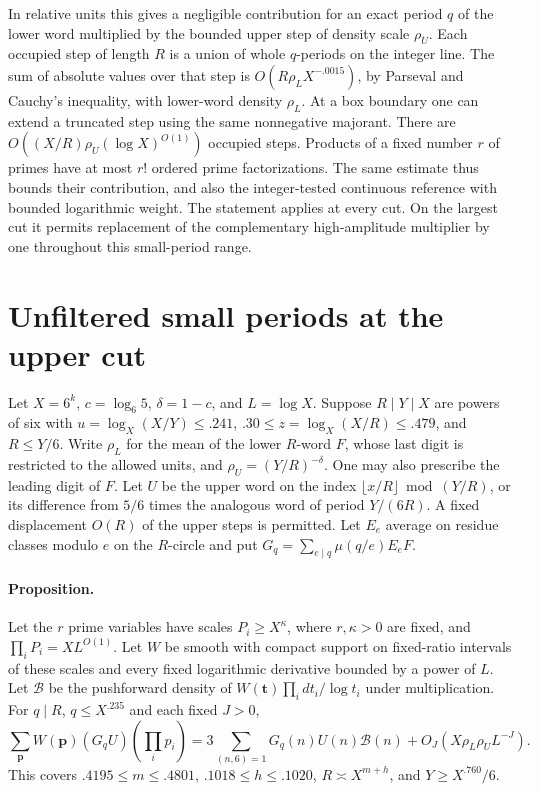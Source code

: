 \documentclass[11pt,a4paper]{article}
\theoremstyle{paperplain}
\numberwithin{equation}{section}
\begin{document}
In relative units this gives a negligible contribution for an exact
period $q$ of the lower word multiplied by the bounded upper step of
density scale $\rho_U$. Each occupied step of length $R$ is a union of
whole $q$-periods on the integer line. The sum of absolute values over
that step is $O(R\rho_L X^{-.0015})$, by Parseval and Cauchy's
inequality, with lower-word density $\rho_L$. At a box boundary one
can extend a truncated step using the same nonnegative majorant.
There are $O((X/R)\rho_U (\log X)^{O(1)})$ occupied steps. Products
of a fixed number $r$ of primes have at most $r!$ ordered prime
factorizations. The same estimate thus bounds their contribution, and
also the integer-tested continuous reference with bounded logarithmic
weight. The statement applies at every cut. On the largest cut it
permits replacement of the complementary high-amplitude multiplier by
one throughout this small-period range.

\section{Unfiltered small periods at the upper cut}
\label{six:unfiltered}

Let $X=6^k$, $c=\log_6 5$, $\delta=1-c$, and $L=\log X$.
Suppose $R\mid Y\mid X$ are powers of six with $u=\log_X(X/Y)\le .241$,
$.30\le z=\log_X(X/R)\le .479$, and $R\le Y/6$.
Write $\rho_L$ for the mean of the lower $R$-word $F$, whose last
digit is restricted to the allowed units, and $\rho_U=(Y/R)^{-\delta}$.
One may also prescribe the leading digit of $F$. Let $U$ be the upper
word on the index $\lfloor x/R\rfloor\bmod (Y/R)$, or its difference
from $5/6$ times the analogous word of period $Y/(6R)$.
A fixed displacement $O(R)$ of the upper steps is permitted. Let $E_e$
average on residue classes modulo $e$ on the $R$-circle and put
$G_q=\sum_{e\mid q}\mu(q/e)E_eF$.

\paragraph{Proposition.}
Let the $r$ prime variables have scales $P_i\ge X^\kappa$,
where $r,\kappa>0$ are fixed, and $\prod_iP_i=XL^{O(1)}$. Let $W$
be smooth with compact support on fixed-ratio intervals of these scales
and every fixed logarithmic derivative bounded by a power of $L$.
Let $\mathcal B$ be the pushforward density of
$W(\boldsymbol t)\prod_i dt_i/\log t_i$ under multiplication.
For $q\mid R$, $q\le X^{.235}$ and each fixed $J>0$,
\[
 \sum_{\boldsymbol p}W(\boldsymbol p)(G_q U)(\textstyle\prod_i p_i)
 = 3\sum_{(n,6)=1} G_q(n)U(n)\mathcal B(n)
       +O_J(X\rho_L\rho_U L^{-J}).
\]
This covers $.4195\le m\le .4801$, $.1018\le h\le .1020$, $R\asymp X^{m+h}$,
and $Y\ge X^{.760}/6$.
\end{document}
